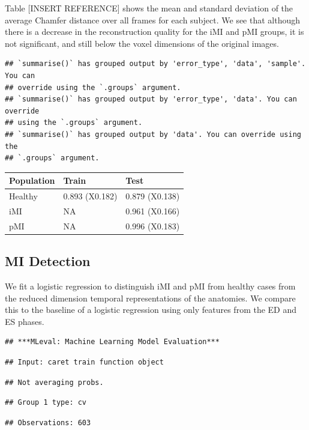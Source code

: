 \documentclass[
]{article}
\begin{document}
Table {[}INSERT REFERENCE{]} shows the mean and standard deviation of
the average Chamfer distance over all frames for each subject. We see
that although there is a decrease in the reconstruction quality for the
iMI and pMI groups, it is not significant, and still below the voxel
dimensions of the original images.

\begin{verbatim}
## `summarise()` has grouped output by 'error_type', 'data', 'sample'. You can
## override using the `.groups` argument.
## `summarise()` has grouped output by 'error_type', 'data'. You can override
## using the `.groups` argument.
## `summarise()` has grouped output by 'data'. You can override using the
## `.groups` argument.
\end{verbatim}

\begin{tabular}{lll}
\toprule
Population & Train & Test\\
\midrule
Healthy & 0.893 (X0.182) & 0.879 (X0.138)\\
iMI & NA & 0.961 (X0.166)\\
pMI & NA & 0.996 (X0.183)\\
\bottomrule
\end{tabular}

\subsection{MI Detection}\label{mi-detection}

We fit a logistic regression to distinguish iMI and pMI from healthy
cases from the reduced dimension temporal representations of the
anatomies. We compare this to the baseline of a logistic regression
using only features from the ED and ES phases.

\begin{verbatim}
## ***MLeval: Machine Learning Model Evaluation***
\end{verbatim}

\begin{verbatim}
## Input: caret train function object
\end{verbatim}

\begin{verbatim}
## Not averaging probs.
\end{verbatim}

\begin{verbatim}
## Group 1 type: cv
\end{verbatim}

\begin{verbatim}
## Observations: 603
\end{verbatim}
\end{document}
